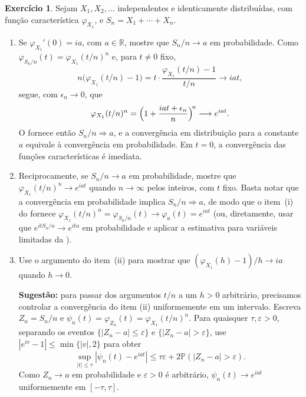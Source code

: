 \documentclass[12pt,portuguese]{article}
\theoremstyle{definition}
\theoremstyle{plainexercise}
\theoremstyle{starredexercise}
\newtheorem{starredexercise}[exercise]{Exercício}
\theoremstyle{definition}
\begin{document}
\begin{starredexercise}\label{exercise:pitman}
Sejam $X_1,X_2,\dots$ independentes e identicamente distribuídas, com função
característica $\varphi_{X_1}$, e $S_n=X_1+\cdots+X_n$.
\begin{enumerate}
\item[(i)] Se $\varphi_{X_1}'(0)=ia$, com $a\in\mathbb{R}$, mostre que
$S_n/n\to a$ em probabilidade. Como $\varphi_{S_n/n}(t)=\varphi_{X_1}(t/n)^n$ e, para
$t\neq0$ fixo,
\[
n\bigl(\varphi_{X_1}(t/n)-1\bigr)
=t\cdot\frac{\varphi_{X_1}(t/n)-1}{t/n}\longrightarrow iat,
\]
segue, com $\epsilon_n\to0$, que
\[
\varphi_{X_1}(t/n)^n
=\Bigl(1+\frac{iat+\epsilon_n}{n}\Bigr)^{\!n}\longrightarrow e^{iat}.
\]
O  fornece então $S_n/n\Rightarrow a$, e a convergência
em distribuição para a constante $a$ equivale à convergência em probabilidade.
Em $t=0$, a convergência das funções características é imediata.

\item[(ii)] Reciprocamente, se $S_n/n\to a$ em probabilidade, mostre que
$\varphi_{X_1}(t/n)^n\to e^{iat}$ quando $n\to\infty$ pelos inteiros, com $t$ fixo.
Basta notar que a convergência em probabilidade implica $S_n/n\Rightarrow a$, de
modo que o item~(i) do  fornece
$\varphi_{X_1}(t/n)^n=\varphi_{S_n/n}(t)\to\varphi_a(t)=e^{iat}$ (ou, diretamente,
usar que $e^{itS_n/n}\to e^{ita}$ em probabilidade e aplicar a estimativa para
variáveis limitadas da ).

\item[(iii)] Use o argumento do item~(ii) para mostrar que
$(\varphi_{X_1}(h)-1)/h\to ia$
quando $h\to0$.

\noindent\textbf{Sugestão:} para passar dos argumentos $t/n$ a um $h>0$
arbitrário, precisamos controlar a convergência do item (ii) uniformemente
em um intervalo. Escreva $Z_n=S_n/n$ e
$\psi_n(t)=\varphi_{Z_n}(t)=\varphi_{X_1}(t/n)^n$. Para quaisquer
$\tau,\varepsilon>0$, separando os eventos $\{|Z_n-a|\leqslant\varepsilon\}$
e $\{|Z_n-a|>\varepsilon\}$, use $|e^{iv}-1|\leqslant\min\{|v|,2\}$ para obter
\[
\sup_{|t|\leqslant\tau}|\psi_n(t)-e^{iat}|
\leqslant\tau\varepsilon+2\mathbb{P}(|Z_n-a|>\varepsilon).
\]
Como $Z_n\to a$ em probabilidade e $\varepsilon>0$ é arbitrário,
$\psi_n(t)\to e^{iat}$ uniformemente em $[-\tau,\tau]$.


\end{enumerate}
\end{starredexercise}
\end{document}
